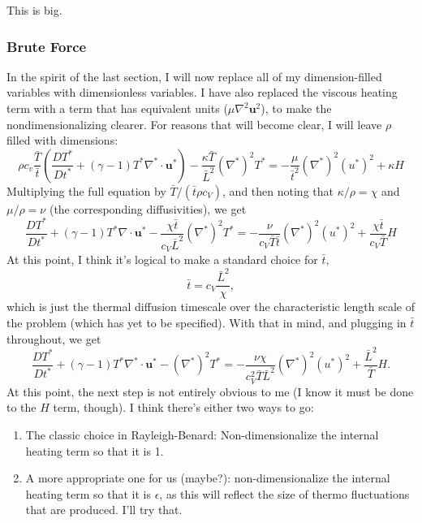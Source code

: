 \documentclass[aps, pre, onecolumn, nofootinbib, notitlepage, groupedaddress, amsfonts, amssymb, amsmath, longbibliography]{revtex4-1}
\newcommand{\grad}{\ensuremath{\nabla}}
\begin{document}
This is big.


\subsubsection{Brute Force}
In the spirit of the last section, I will now replace all of my dimension-filled variables
with dimensionless variables.  I have also replaced the viscous heating term with a term
that has equivalent units ($\mu \grad^2 \bm{u}^2$), to make the nondimensionalizing clearer.
For reasons that will become clear, I will leave $\rho$ filled with dimensions:
\begin{equation}
\rho c_v \frac{\bar{T}}{\bar{t}}\left(\frac{D T^*}{D t^*} + (\gamma - 1)T^*\grad^*\cdot\bm{u}^*\right)
- \frac{\kappa \bar{T}}{\bar{L}^2} (\grad^*)^2 T^* = - \frac{\mu}{\bar{t}^2}(\grad^*)^2 (u^*)^2
+ \kappa H
\end{equation}
Multiplying the full equation by $\bar{T}/ (\bar{t} \rho c_V)$, and then noting that
$\kappa / \rho = \chi$ and $\mu / \rho = \nu$ (the corresponding diffusivities), we get
\begin{equation}
\frac{D T^*}{D t^*} + (\gamma - 1)T^*\grad \cdot\bm{u}^* - \frac{\chi \bar{t}}{c_V \bar{L}^2}
(\grad^*)^2 T^* = -\frac{\nu}{c_V\bar{T}\bar{t}}(\grad^*)^2(u^*)^2 + \frac{\chi \bar{t}}{c_V\bar{T}} H
\end{equation}
At this point, I think it's logical to make a standard choice for $\bar{t}$,
$$
\bar{t} = c_V\frac{\bar{L}^2}{\chi},
$$
which is just the thermal diffusion timescale over the characteristic length scale of the
problem (which has yet to be specified).  With that in mind, and plugging in $\bar{t}$
throughout, we get
\begin{equation}
\frac{D T^*}{D t^*} + (\gamma - 1) T^* \grad^*\cdot\bm{u}^* - (\grad^*)^2T^* =
-\frac{\nu\chi}{c_V^2 \bar{T} \bar{L}^2} (\grad^*)^2(u^*)^2 + \frac{\bar{L}^2}{\bar{T}} H.
\end{equation}
At this point, the next step is not entirely obvious to me (I know it must be done to the
$H$ term, though).  I think there's either two ways to go:
\begin{enumerate}
\item The classic choice in Rayleigh-Benard: Non-dimensionalize the internal heating term
so that it is 1.
\item A more appropriate one for us (maybe?): non-dimensionalize the internal heating term
so that it is $\epsilon$, as this will reflect the size of thermo fluctuations that are produced.
I'll try that.
\end{enumerate}
\end{document}
